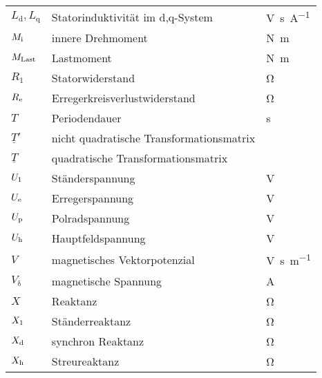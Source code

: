 \begin{flushleft}
\begin{tabularx}{\textwidth}{lll}
$L_\mathrm{d}, L_\mathrm{q}$	& 	Statorinduktivität im d,q-System & \si{\volt\second\per\ampere}\\
$M_{\mathrm{i}}$			&	innere Drehmoment		&	\si{\newton\meter} \\
$M_{\mathrm{Last}}$			&	Lastmoment		&	\si{\newton\meter} \\
$R_\mathrm{1}$		&	Statorwiderstand			&	\si{\ohm} \\
$R_{\mathrm{e}}$	&	Erregerkreisverlustwiderstand &	\si{\ohm}\\
$T$ & Periodendauer & \si{\second} \\
$\underline{T}'$ & nicht quadratische Transformationsmatrix & \\
$\underline{T}$ & quadratische Transformationsmatrix & \\
$U_{\mathrm{1}}$ & Ständerspannung & \si{\volt}\\
$U_{\mathrm{e}}$ & Erregerspannung & \si{\volt}\\
$U_{\mathrm{p}}$ & Polradspannung & \si{\volt}\\
$U_{\mathrm{h}}$ & Hauptfeldspannung & \si{\volt}\\
$V$ &	magnetisches Vektorpotenzial&	\si{\volt\second\per\meter}\\
$V_\mathrm{\delta}$		&	magnetische Spannung		&	\si{\ampere} \\
$X$	& 	Reaktanz & \si{\ohm}\\
$X_{\mathrm{1}}$	& 	Ständerreaktanz & \si{\ohm}\\
$X_{\mathrm{d}}$	& 	synchron Reaktanz & \si{\ohm}\\
$X_{\mathrm{h}}$	& 	Streureaktanz & \si{\ohm}\\
\bottomrule
\end{tabularx}
\end{flushleft}

